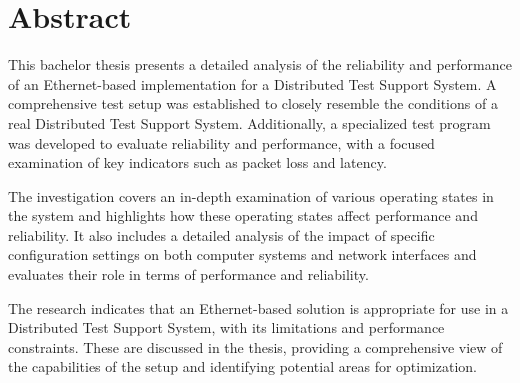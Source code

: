 \cleardoublepage

\chapter*{Abstract}
This bachelor thesis presents a detailed analysis of the reliability and performance of an Ethernet-based implementation for a Distributed Test Support System. A comprehensive test setup was established to closely resemble the conditions of a real Distributed Test Support System. Additionally, a specialized test program was developed to evaluate reliability and performance, with a focused examination of key indicators such as packet loss and latency.

The investigation covers an in-depth examination of various operating states in the system and highlights how these operating states affect performance and reliability. It also includes a detailed analysis of the impact of specific configuration settings on both computer systems and network interfaces and evaluates their role in terms of performance and reliability.

The research indicates that an Ethernet-based solution is appropriate for use in a Distributed Test Support System, with its limitations and performance constraints. These are discussed in the thesis, providing a comprehensive view of the capabilities of the setup and identifying potential areas for optimization.